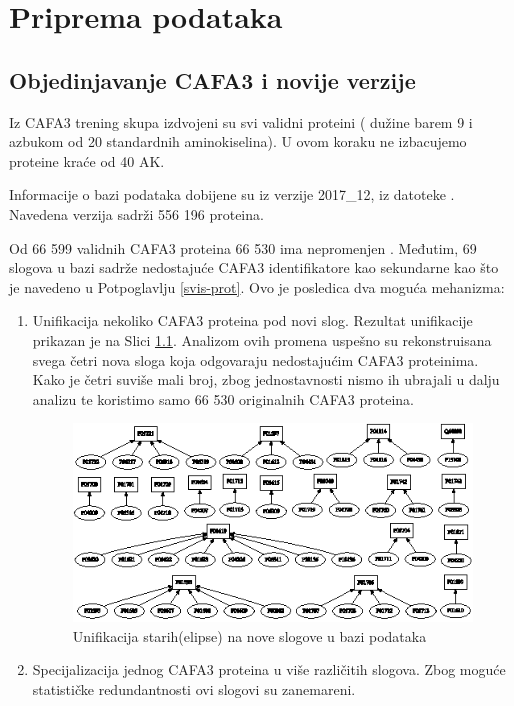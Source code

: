 
\chapter{Priprema podataka} %

\label{Priprema_podataka} %

\section{Objedinjavanje CAFA3 i novije \swissprot verzije}

Iz CAFA3 trening skupa izdvojeni su svi validni proteini ( dužine barem 9 i
azbukom od 20 standardnih aminokiselina). U ovom koraku ne izbacujemo proteine
kraće od 40 AK.

Informacije o \swissprot bazi podataka dobijene su iz verzije 2017\_12, iz datoteke
 \cite{sprot}.
Navedena verzija sadrži 556 196 proteina. 

Od 66 599 validnih CAFA3 proteina 66 530 ima nepromenjen . Međutim, 69 slogova u \swissprot bazi sadrže nedostajuće CAFA3
identifikatore kao sekundarne kao što je navedeno u Potpoglavlju
\ref{svis-prot}. Ovo je posledica dva moguća mehanizma:

\begin{enumerate}
  \item Unifikacija nekoliko CAFA3 proteina pod novi slog.
    Rezultat unifikacije prikazan je na Slici \ref{fig:unifikacija_slogova}. Analizom
    ovih promena uspešno su rekonstruisana svega četri nova \swissprot sloga
    koja odgovaraju nedostajućim CAFA3 proteinima. Kako je četri
    suviše mali broj, zbog jednostavnosti nismo ih ubrajali u dalju analizu
    te koristimo samo 66 530 originalnih CAFA3 proteina.

  \begin{figure}[th]
  \centering
  \includegraphics[scale=2]{plots/unifikacija_slogova2.eps}
  \decoRule
  \caption{Unifikacija starih(elipse) na nove slogove u \swissprot bazi podataka}
  \label{fig:unifikacija_slogova}
  \end{figure}

  \item Specijalizacija jednog CAFA3 proteina u više različitih slogova.  Zbog moguće
    statističke redundantnosti ovi slogovi su zanemareni.
\end{enumerate}



